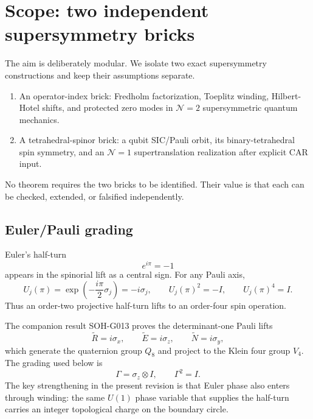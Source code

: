 \section{Scope: two independent supersymmetry bricks}

The aim is deliberately modular. We isolate two exact supersymmetry constructions and keep their assumptions separate.

\begin{enumerate}[label=\textbf{S\arabic*.}]
\item An operator-index brick: Fredholm factorization, Toeplitz winding, Hilbert-Hotel shifts, and protected zero modes in $\mathcal N=2$ supersymmetric quantum mechanics.
\item A tetrahedral-spinor brick: a qubit SIC/Pauli orbit, its binary-tetrahedral spin symmetry, and an $\mathcal N=1$ supertranslation realization after explicit CAR input.
\end{enumerate}

No theorem requires the two bricks to be identified. Their value is that each can be checked, extended, or falsified independently.

\subsection{Euler/Pauli grading}

Euler's half-turn
\[
e^{i\pi}=-1
\]
appears in the spinorial lift as a central sign. For any Pauli axis,
\[
U_j(\pi)=\exp\!\left(-\frac{i\pi}{2}\sigma_j\right)=-i\sigma_j,
\qquad
U_j(\pi)^2=-I,
\qquad
U_j(\pi)^4=I.
\]
Thus an order-two projective half-turn lifts to an order-four spin operation.

The companion result SOH-G013 proves the determinant-one Pauli lifts
\[
\widetilde R=i\sigma_x,
\qquad
\widetilde E=i\sigma_z,
\qquad
\widetilde N=i\sigma_y,
\]
which generate the quaternion group $Q_8$ and project to the Klein four group $V_4$. The grading used below is
\[
\Gamma=\sigma_z\otimes I,
\qquad
\Gamma^2=I.
\]
The key strengthening in the present revision is that Euler phase also enters through winding: the same $U(1)$ phase variable that supplies the half-turn carries an integer topological charge on the boundary circle.
